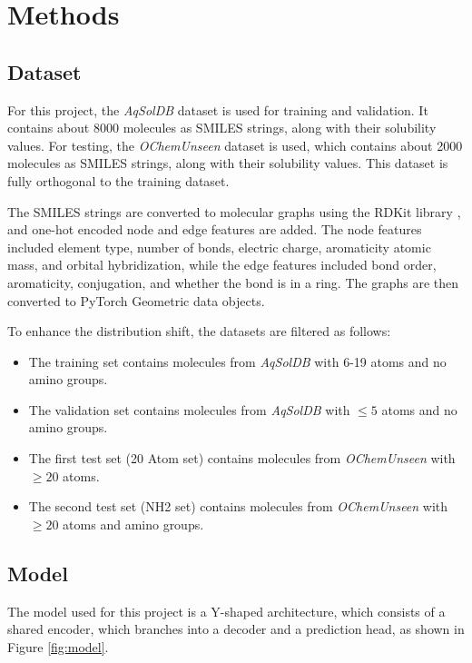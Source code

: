 \documentclass[11pt,a4paper]{article}
\begin{document}
\section{Methods}
\subsection{Dataset}

For this project, the \textit{AqSolDB} dataset \cite{sorkun2019aqsoldb} is used for training and validation. It contains about 8000 molecules as SMILES strings, along with their solubility values. For testing, the \textit{OChemUnseen} dataset \cite{llompart2024will} is used, which contains about 2000 molecules as SMILES strings, along with their solubility values. This dataset is fully orthogonal to the training dataset.

The SMILES strings are converted to molecular graphs using the RDKit library \cite{rdkit2025}, and one-hot encoded node and edge features are added. The node features included element type, number of bonds, electric charge, aromaticity atomic mass, and orbital hybridization, while the edge features included bond order, aromaticity, conjugation, and whether the bond is in a ring. The graphs are then converted to PyTorch Geometric \cite{fey2019fast} data objects.

To enhance the distribution shift, the datasets are filtered as follows:
\begin{itemize}
        \item The training set contains molecules from \textit{AqSolDB} with 6-19 atoms and no amino groups.
        \item The validation set contains molecules from \textit{AqSolDB} with $\leq 5$ atoms and no amino groups.
        \item The first test set (20 Atom set) contains molecules from \textit{OChemUnseen} with $\geq 20$ atoms.
        \item The second test set (NH2 set) contains molecules from \textit{OChemUnseen} with $\geq 20$ atoms and amino groups.
\end{itemize}

\subsection{Model}

The model used for this project is a Y-shaped architecture, which consists of a shared encoder, which branches into a decoder and a prediction head, as shown in Figure \ref{fig:model}.
\end{document}
